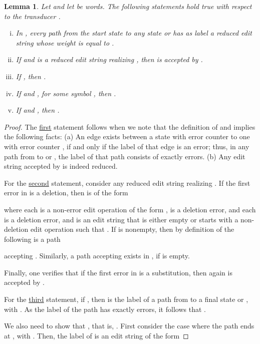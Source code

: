 \documentclass{article}
\theoremstyle{plain}
\newtheorem{lemma}[theorem]{Lemma}
\theoremstyle{definition}
\theoremstyle{remark}
\begin{document}
\begin{lemma}\label{lem:Adi:props}
Let  and let  be words. The following statements hold true with respect to the transducer .
\begin{enumerate}[i.)]
\item
In , every path from the start state  to any state  or  has as label a reduced edit string
whose weight is equal to .
\item
If  and  is a reduced edit string realizing , then
 is accepted by .
\item
If , then .
\item
If  and , for some symbol , then   .
\item
If  and , then .
\end{enumerate}
\end{lemma}
\begin{proof}
The \underline{first} statement follows when we note that the  definition of  and  implies the
following facts: (a) An edge exists between a state
with error counter  to one with error counter  ,
if and only if the label of that edge is an error;
thus, in any path from  to  or , the label of that path consists of exactly  errors.
(b) Any edit string accepted by  is indeed reduced.
\par
For the \underline{second} statement, consider any reduced edit string  realizing .
If the first error in  is a deletion, then  is of
the form
      
where each  is a non-error edit operation
of the form , 
is a deletion error,  and each  is
a deletion error, and  is an edit string that is
either empty
or starts with a non-deletion edit operation 
such that . If  is nonempty, then by definition of  the
following is a path

accepting . Similarly, a path accepting  exists in
 , if  is empty.
\par
Finally, one verifies that if the first error in 
is a substitution, then again  is accepted by .
\par
For the \underline{third} statement, if , then  is the label of a path  from 
to a final state  or , with . As the label of the path  has exactly  errors,
it follows that .
\par
 We also need to show that , that is, .
First consider the case where the path  ends at , with . Then,
the label of  is an edit string of the form


\end{proof}
\end{document}
